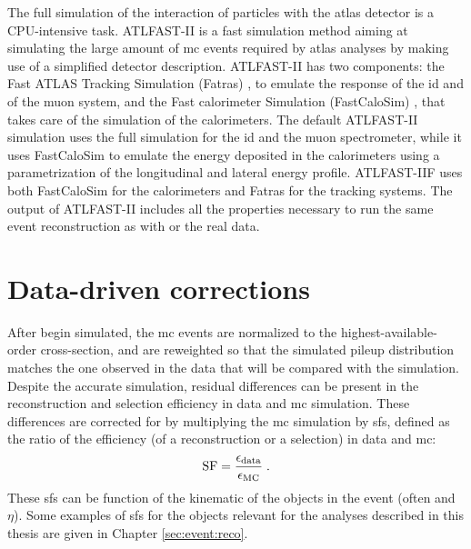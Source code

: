 The full simulation of the interaction of particles with the \gls{atlas} detector is a CPU-intensive task. 
ATLFAST-II \cite{Aad:2010ah} is a fast simulation method aiming at simulating the large amount of \gls{mc} events required by \gls{atlas} analyses by making use of a simplified detector description. 
ATLFAST-II has two components: the Fast ATLAS Tracking Simulation (Fatras) \cite{Edmonds:2008zz}, to emulate the response of the \gls{id} and of the muon system, 
and the Fast calorimeter Simulation (FastCaloSim) \cite{ATLAS:1300517}, that takes care of the simulation of the calorimeters. The default ATLFAST-II simulation uses the full \geant simulation for the \gls{id} and the muon spectrometer, 
while it uses FastCaloSim to emulate the energy deposited in the calorimeters using a parametrization of the longitudinal and lateral energy profile. 
ATLFAST-IIF uses both FastCaloSim for the calorimeters and Fatras for the tracking systems. 
The output of ATLFAST-II includes all the properties necessary to run the same event reconstruction as with \geant or the real data.



\section{Data-driven corrections}
\label{sec:datacorr}

After begin simulated, the \gls{mc} events are normalized to the highest-available-order cross-section, and are reweighted so that the simulated pileup distribution matches the one observed in the data that will be compared with the simulation.
Despite the accurate simulation, residual differences can be present in the reconstruction and selection efficiency in data and \gls{mc} simulation. 
These differences are corrected for by multiplying the \gls{mc} simulation by \glspl{sf}, defined as the ratio of the efficiency (of a reconstruction or a selection) in data and \gls{mc}:
\begin{equation}
{\rm SF} = \frac{\epsilon_{\rm data}}{\epsilon_{\rm MC}} \; .
\end{equation}
\noindent These \glspl{sf} can be function of the kinematic of the objects in the event (often \pt and $\eta$). 
Some examples of \glspl{sf} for the objects relevant for the analyses described in this thesis are given in Chapter \ref{sec:event:reco}.




